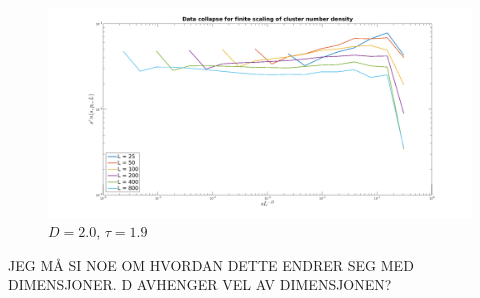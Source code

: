 \documentclass[english, a4paper]{article}
\begin{document}
\begin{figure}[H]
  \begin{center}
  \includegraphics[width = 140mm]{cndDataCollapseD2Tau19.png}
  \caption{$D=2.0$, $\tau = 1.9$}
  \label{fig:fig3}
  \end{center}
\end{figure}


JEG MÅ SI NOE OM HVORDAN DETTE ENDRER SEG MED DIMENSJONER. D AVHENGER VEL AV DIMENSJONEN?
\end{document}
